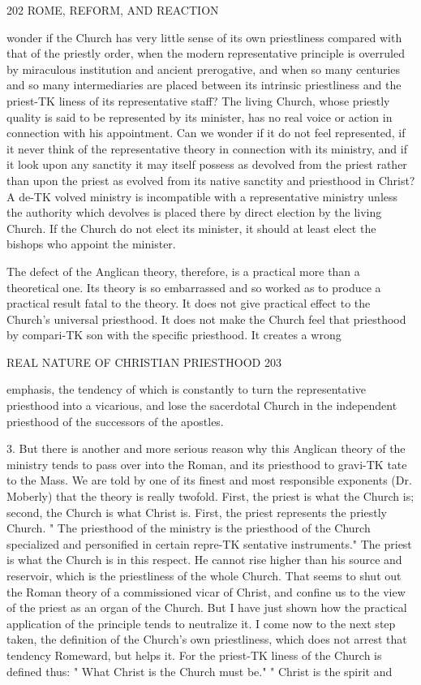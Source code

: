 \documentclass[12pt,a5paper,oneside]{book}
\begin{document}
{{202 ROME, REFORM, AND REACTION 

wonder if the Church has very little sense of its own 
priestliness compared with that of the priestly order, 
when the modern representative principle is overruled 
by miraculous institution and ancient prerogative, and 
when so many centuries and so many intermediaries are 
placed between its intrinsic priestliness and the priest-TK
liness of its representative staff? The living Church, 
whose priestly quality is said to be represented by its 
minister, has no real voice or action in connection 
with his appointment. Can we wonder if it do not 
feel represented, if it never think of the representative 
theory in connection with its ministry, and if it look 
upon any sanctity it may itself possess as devolved from 
the priest rather than upon the priest as evolved from 
its native sanctity and priesthood in Christ? A de-TK
volved ministry is incompatible with a representative 
ministry unless the authority which devolves is placed 
there by direct election by the living Church. If the 
Church do not elect its minister, it should at least 
elect the bishops who appoint the minister. 

The defect of the Anglican theory, therefore, is a 
practical more than a theoretical one. Its theory is 
so embarrassed and so worked as to produce a practical 
result fatal to the theory. It does not give practical 
effect to the Church's universal priesthood. It does 
not make the Church feel that priesthood by compari-TK
son with the specific priesthood. It creates a wrong 



REAL NATURE OF CHRISTIAN PRIESTHOOD 203 

emphasis, the tendency of which is constantly to turn 
the representative priesthood into a vicarious, and lose 
the sacerdotal Church in the independent priesthood 
of the successors of the apostles. 

3. But there is another and more serious reason 
why this Anglican theory of the ministry tends to 
pass over into the Roman, and its priesthood to gravi-TK
tate to the Mass. We are told by one of its finest 
and most responsible exponents (Dr. Moberly) that 
the theory is really twofold. First, the priest is what 
the Church is; second, the Church is what Christ is. 
First, the priest represents the priestly Church. " The 
priesthood of the ministry is the priesthood of the 
Church specialized and personified in certain repre-TK
sentative instruments." The priest is what the 
Church is in this respect. He cannot rise higher 
than his source and reservoir, which is the priestliness 
of the whole Church. That seems to shut out the 
Roman theory of a commissioned vicar of Christ, and 
confine us to the view of the priest as an organ of 
the Church. But I have just shown how the practical 
application of the principle tends to neutralize it. I 
come now to the next step taken, the definition of 
the Church's own priestliness, which does not arrest 
that tendency Romeward, but helps it. For the priest-TK
liness of the Church is defined thus: " What Christ 
is the Church must be." " Christ is the spirit and 



}}
\end{document}
